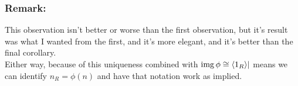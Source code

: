 \subsubsection{Remark:}
This observation isn't better or worse than the first observation,
but it's result was what I wanted from the first,
and it's more elegant,
and it's better than the final corollary.
\\

Either way, because of this uniqueness combined with $\operatorname{img}\phi\cong\langle 1_R \rangle|$ means we can identify $n_R = \phi(n)$ and have that notation work as implied.
